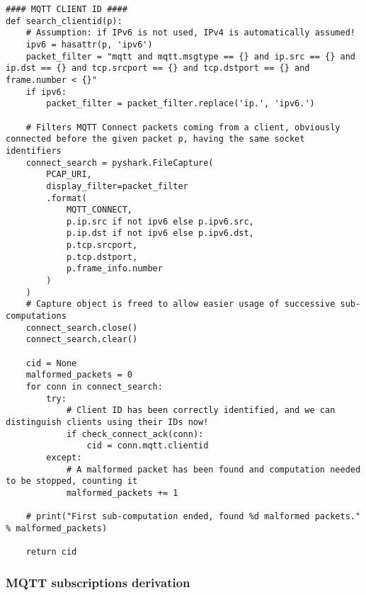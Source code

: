 \documentclass[a4paper,11pt]{article} %
\begin{document}
    \begin{verbatim}
#### MQTT CLIENT ID ####
def search_clientid(p):
    # Assumption: if IPv6 is not used, IPv4 is automatically assumed!
    ipv6 = hasattr(p, 'ipv6')
    packet_filter = "mqtt and mqtt.msgtype == {} and ip.src == {} and ip.dst == {} and tcp.srcport == {} and tcp.dstport == {} and frame.number < {}"
    if ipv6:
        packet_filter = packet_filter.replace('ip.', 'ipv6.')

    # Filters MQTT Connect packets coming from a client, obviously connected before the given packet p, having the same socket identifiers
    connect_search = pyshark.FileCapture(
        PCAP_URI,
        display_filter=packet_filter
        .format(
            MQTT_CONNECT,
            p.ip.src if not ipv6 else p.ipv6.src,
            p.ip.dst if not ipv6 else p.ipv6.dst,
            p.tcp.srcport,
            p.tcp.dstport,
            p.frame_info.number
        )
    )
    # Capture object is freed to allow easier usage of successive sub-computations
    connect_search.close()
    connect_search.clear()

    cid = None
    malformed_packets = 0
    for conn in connect_search:
        try:
            # Client ID has been correctly identified, and we can distinguish clients using their IDs now!
            if check_connect_ack(conn):
                cid = conn.mqtt.clientid
        except:
            # A malformed packet has been found and computation needed to be stopped, counting it
            malformed_packets += 1

    # print("First sub-computation ended, found %d malformed packets." % malformed_packets)

    return cid
    \end{verbatim}

    \subsubsection{MQTT subscriptions derivation}
    \label{subsubsec:mqtt-subscriptions}
\end{document}
